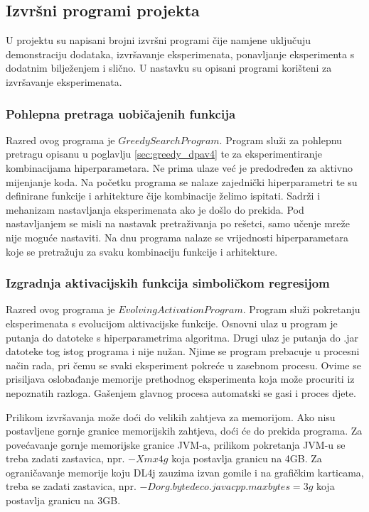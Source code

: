 \documentclass[times, utf8, numeric, diplomski]{fer}
\begin{document}
\subsection{Izvršni programi projekta}
U projektu su napisani brojni izvršni programi čije namjene uključuju demonstraciju dodataka, izvršavanje eksperimenata, ponavljanje eksperimenta s dodatnim bilježenjem i slično. U nastavku su opisani programi korišteni za izvršavanje eksperimenata.

\subsubsection{Pohlepna pretraga uobičajenih funkcija}
Razred ovog programa je $GreedySearchProgram$. Program služi za pohlepnu pretragu opisanu u poglavlju \ref{sec:greedy_dpav4} te za eksperimentiranje kombinacijama hiperparametara. Ne prima ulaze već je predodređen za aktivno mijenjanje koda. Na početku programa se nalaze zajednički hiperparametri te su definirane funkcije i arhitekture čije kombinacije želimo ispitati. Sadrži i mehanizam nastavljanja eksperimenata ako je došlo do prekida. Pod nastavljanjem se misli na nastavak pretraživanja po rešetci, samo učenje mreže nije moguće nastaviti. Na dnu programa nalaze se vrijednosti hiperparametara koje se pretražuju za svaku kombinaciju funkcije i arhitekture.

\subsubsection{Izgradnja aktivacijskih funkcija simboličkom regresijom}
Razred ovog programa je $EvolvingActivationProgram$. Program služi pokretanju eksperimenata s evolucijom aktivacijske funkcije. Osnovni ulaz u program je putanja do datoteke s hiperparametrima algoritma. Drugi ulaz je putanja do .jar datoteke tog istog programa i nije nužan. Njime se program prebacuje u procesni način rada, pri čemu se svaki eksperiment pokreće u zasebnom procesu. Ovime se prisiljava oslobađanje memorije prethodnog eksperimenta koja može procuriti iz nepoznatih razloga. Gašenjem glavnog procesa automatski se gasi i proces djete.

Prilikom izvršavanja može doći do velikih zahtjeva za memorijom. Ako nisu postavljene gornje granice memorijskih zahtjeva, doći će do prekida programa. Za povećavanje gornje memorijske granice JVM-a, prilikom pokretanja JVM-u se treba zadati zastavica, npr. $-Xmx4g$ koja postavlja granicu na 4GB. Za ograničavanje memorije koju DL4j zauzima izvan gomile i na grafičkim karticama, treba se zadati zastavica, npr. $-Dorg.bytedeco.javacpp.maxbytes=3g$ koja postavlja granicu na 3GB.
\end{document}
